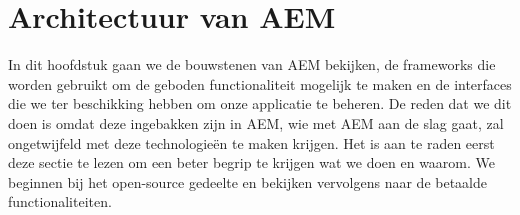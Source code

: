 \documentclass{article}
\begin{document}
	\section{Architectuur van AEM}
	In dit hoofdstuk gaan we de bouwstenen van AEM bekijken, de frameworks die worden gebruikt om de geboden functionaliteit mogelijk te maken en de interfaces die we ter beschikking hebben om onze applicatie te beheren. De reden dat we dit doen is omdat deze ingebakken zijn in AEM, wie met AEM aan de slag gaat, zal ongetwijfeld met deze technologie\"en te maken krijgen. Het is aan te raden eerst deze sectie te lezen om een beter begrip te krijgen wat we doen en waarom. We beginnen bij het open-source gedeelte en bekijken vervolgens naar de betaalde functionaliteiten.
\end{document}
